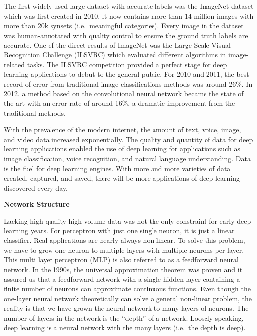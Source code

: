 \documentclass[12pt,]{krantz}
\begin{document}
The first widely used large dataset with accurate labels was the ImageNet dataset which was first created in 2010. It now contains more than 14 million images with more than 20k synsets (i.e.~meaningful categories). Every image in the dataset was human-annotated with quality control to ensure the ground truth labels are accurate. One of the direct results of ImageNet was the Large Scale Visual Recognition Challenge (ILSVRC) which evaluated different algorithms in image-related tasks. The ILSVRC competition provided a perfect stage for deep learning applications to debut to the general public. For 2010 and 2011, the best record of error from traditional image classifications methods was around 26\%. In 2012, a method based on the convolutional neural network became the state of the art with an error rate of around 16\%, a dramatic improvement from the traditional methods.

With the prevalence of the modern internet, the amount of text, voice, image, and video data increased exponentially. The quality and quantity of data for deep learning applications enabled the use of deep learning for applications such as image classification, voice recognition, and natural language understanding. Data is the fuel for deep learning engines. With more and more varieties of data created, captured, and saved, there will be more applications of deep learning discovered every day.

\textbf{Network Structure}

Lacking high-quality high-volume data was not the only constraint for early deep learning years. For perceptron with just one single neuron, it is just a linear classifier. Real applications are nearly always non-linear. To solve this problem, we have to grow one neuron to multiple layers with multiple neurons per layer. This multi layer perceptron (MLP) is also referred to as a feedforward neural network. In the 1990s, the universal approximation theorem was proven and it assured us that a feedforward network with a single hidden layer containing a finite number of neurons can approximate continuous functions. Even though the one-layer neural network theoretically can solve a general non-linear problem, the reality is that we have grown the neural network to many layers of neurons. The number of layers in the network is the ``depth'' of a network. Loosely speaking, deep learning is a neural network with the many layers (i.e.~the depth is deep).
\end{document}
